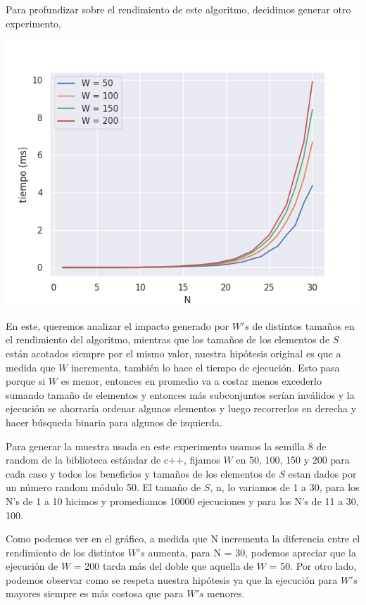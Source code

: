 \documentclass[a4paper]{article}
\begin{document}
\break

Para profundizar sobre el rendimiento de este algoritmo, decidimos generar otro experimento,

\begin{minipage}{0.5\textwidth}
\includegraphics[scale=0.5]{mitmCasoProm4Ws.png}
\end{minipage} \hfill
\begin{minipage}{0.5\textwidth}

En este, queremos analizar el impacto generado por $W's$ de distintos tamaños en el rendimiento del algoritmo, mientras que los tamaños de los elementos de $S$ están acotados siempre por el mismo valor, nuestra hipótesis original es que a medida que $W$ incrementa, también lo hace el tiempo de ejecución. Esto pasa porque si $W$ es menor, entonces en promedio va a costar menos excederlo sumando tamaño de elementos y entonces más subconjuntos serían inválidos y la ejecución se ahorraría ordenar algunos elementos y luego recorrerlos en derecha y hacer búsqueda binaria para algunos de izquierda.

\end{minipage}

Para generar la muestra usada en este experimento usamos la semilla 8 de random de la biblioteca estándar de c++, fijamos $W$ en 50, 100, 150 y 200 para cada caso y todos los beneficios y tamaños de los elementos de $S$ estan dados por un número random módulo 50. El tamaño de $S$, n, lo variamos de 1 a 30, para los N's de 1 a 10 hicimos y promediamos 10000 ejecuciones y para los N's de 11 a 30, 100.

Como podemos ver en el gráfico, a medida que N incrementa la diferencia entre el rendimiento de los distintos $W's$ aumenta, para N = 30, podemos apreciar que la ejecución de $W$ = 200 tarda más del doble que aquella de $W$ = 50. Por otro lado, podemos observar como se respeta nuestra hipótesis ya que la ejecución para $W's$ mayores siempre es más costosa que para $W's$ menores.
\end{document}
